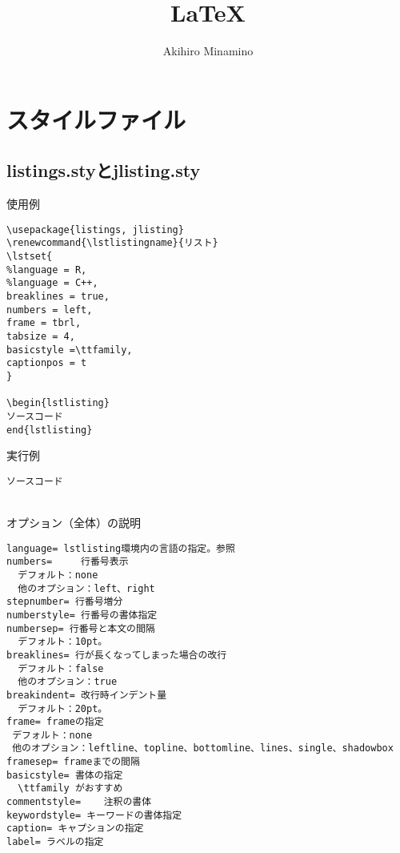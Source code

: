 \documentclass[11pt, oneside]{article}   	%
\title{\LaTeX}
\author{Akihiro Minamino}
\renewcommand{\lstlistingname}{リスト}
\begin{document}
\maketitle

\section{スタイルファイル}
\subsection{listings.styとjlisting.sty}
使用例
\begin{lstlisting}
\usepackage{listings, jlisting}
\renewcommand{\lstlistingname}{リスト}
\lstset{
%language = R,
%language = C++,   
breaklines = true,
numbers = left,
frame = tbrl,
tabsize = 4,
basicstyle =\ttfamily,
captionpos = t
}

\begin{lstlisting}
ソースコード
end{lstlisting}
\end{lstlisting} 
実行例
\begin{lstlisting}
ソースコード
\end{lstlisting}
　\\
オプション（全体）の説明
\begin{lstlisting}
language= lstlisting環境内の言語の指定。参照
numbers=	 行番号表示
  デフォルト：none
  他のオプション：left、right
stepnumber= 行番号増分
numberstyle= 行番号の書体指定
numbersep= 行番号と本文の間隔
  デフォルト：10pt。
breaklines= 行が長くなってしまった場合の改行
  デフォルト：false
  他のオプション：true
breakindent= 改行時インデント量
  デフォルト：20pt。
frame= frameの指定
 デフォルト：none
 他のオプション：leftline、topline、bottomline、lines、single、shadowbox
framesep= frameまでの間隔
basicstyle= 書体の指定
  \ttfamily がおすすめ
commentstyle=	 注釈の書体
keywordstyle= キーワードの書体指定
caption= キャプションの指定
label= ラベルの指定
\end{lstlisting}
\end{document}
